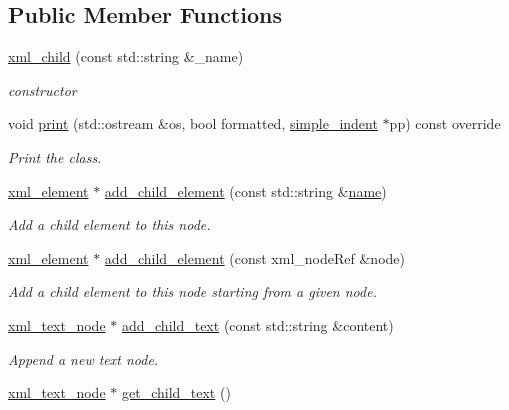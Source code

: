 \subsection*{Public Member Functions}
\begin{DoxyCompactItemize}
\item 
\hyperlink{classxml__child_ab86f5857a17d7ff02e38af048d5341a7}{xml\+\_\+child} (const std\+::string \&\+\_\+name)
\begin{DoxyCompactList}\small\item\em constructor \end{DoxyCompactList}\item 
void \hyperlink{classxml__child_a9a8f42eaeaec40f4cb26582da2bcf61d}{print} (std\+::ostream \&os, bool formatted, \hyperlink{classsimple__indent}{simple\+\_\+indent} $\ast$pp) const override
\begin{DoxyCompactList}\small\item\em Print the class. \end{DoxyCompactList}\item 
\hyperlink{classxml__element}{xml\+\_\+element} $\ast$ \hyperlink{classxml__child_a07932d44513704bb21e12bd693fc917e}{add\+\_\+child\+\_\+element} (const std\+::string \&\hyperlink{classxml__node_ae2af9d4ef2a866cdb4497cd6e5c34b7a}{name})
\begin{DoxyCompactList}\small\item\em Add a child element to this node. \end{DoxyCompactList}\item 
\hyperlink{classxml__element}{xml\+\_\+element} $\ast$ \hyperlink{classxml__child_ad40725a0ffe13e1618ef1d9c757a9357}{add\+\_\+child\+\_\+element} (const xml\+\_\+node\+Ref \&node)
\begin{DoxyCompactList}\small\item\em Add a child element to this node starting from a given node. \end{DoxyCompactList}\item 
\hyperlink{classxml__text__node}{xml\+\_\+text\+\_\+node} $\ast$ \hyperlink{classxml__child_aed891875a02dccfdcf459956e728f872}{add\+\_\+child\+\_\+text} (const std\+::string \&content)
\begin{DoxyCompactList}\small\item\em Append a new text node. \end{DoxyCompactList}\item 
\hyperlink{classxml__text__node}{xml\+\_\+text\+\_\+node} $\ast$ \hyperlink{classxml__child_aad2e6a11fcbe5e07fe1269444c9ab0ea}{get\+\_\+child\+\_\+text} ()

\end{DoxyCompactItemize}
